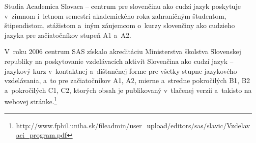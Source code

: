 Studia Academica Slovaca – centrum pre slovenčinu ako cudzí jazyk poskytuje v~zimnom i~letnom semestri akademického roka zahraničným študentom, štipendistom, stážistom a~iným záujemcom o~kurzy slovenčiny ako cudzieho jazyka pre začiatočníkov stupeň A1 a~A2.

V~roku 2006 centrum SAS získalo akreditáciu Ministerstva školstva Slovenskej republiky na poskytovanie vzdelávacích aktivít Slovenčina ako cudzí jazyk – jazykový kurz v~kontaktnej a~dištančnej forme pre všetky stupne jazykového vzdelávania, a~to pre začiatočníkov A1, A2, mierne a~stredne pokročilých B1, B2 a~pokročilých C1, C2, ktorých obsah je publikovaný v~tlačenej verzii \cite{pekarovicova2007} a~takisto na webovej stránke.\footnote{\url{http://www.fphil.uniba.sk/fileadmin/user_upload/editors/sas/slavic/Vzdelavaci_program.pdf}}

